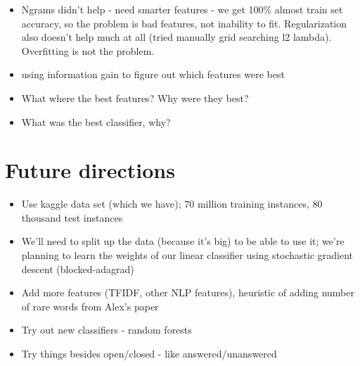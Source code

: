 \documentclass[11pt]{article}
\begin{document}
\begin{itemize}
  \item Ngrams didn’t help - need smarter features - we get 100\%
    almost train set accuracy, so the problem is bad features, not
    inability to fit. Regularization also doesn’t help much at all
    (tried manually grid searching l2 lambda). Overfitting is not the
    problem.
  \item using information gain to figure out which features were best
  \item What where the best features? Why were they best?
  \item What was the best classifier, why?
\end{itemize}

\section{Future directions}
\begin{itemize}
\item Use kaggle data set (which we have); 70 million training instances, 80 thousand test instances
\item We’ll need to split up the data (because it’s big) to be able to use it; we’re planning to learn the weights of our linear classifier using stochastic gradient descent (blocked-adagrad)
\item Add more features (TFIDF, other NLP features), heuristic of adding number of rare words from Alex’s paper
\item Try out new classifiers - random forests
\item Try things besides open/closed - like answered/unanswered
\end{itemize}

{}

\end{document}
